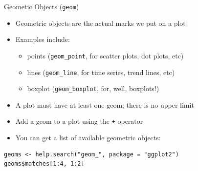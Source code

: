 \documentclass[table,smaller]{beamer}
\begin{document}
\begin{frame}[fragile,label=sec-2-2]{Geometic Objects (\texttt{geom})}
 \begin{itemize}
\item Geometric objects are the actual marks we put on a plot
\item Examples include:
\begin{itemize}
\item points (\texttt{geom\_point}, for scatter plots, dot plots, etc)
\item lines (\texttt{geom\_line}, for time series, trend lines, etc)
\item boxplot (\texttt{geom\_boxplot}, for, well, boxplots!)
\end{itemize}
\item A plot must have at least one geom; there is no upper limit
\item Add a geom to a plot using the \texttt{+} operator
\item You can get a list of available geometric objects:
\end{itemize}
\begin{verbatim}
geoms <- help.search("geom_", package = "ggplot2")
geoms$matches[1:4, 1:2]
\end{verbatim}
\end{frame}
\end{document}
